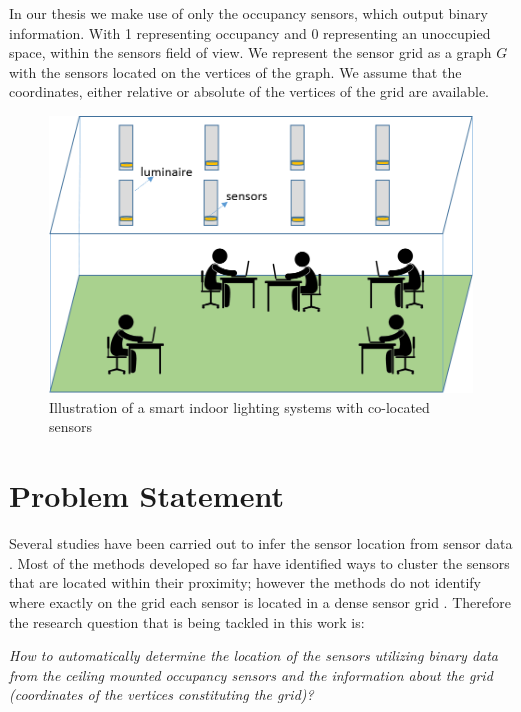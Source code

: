 In our thesis we make use of only the occupancy sensors, which output binary information. With 1 representing occupancy and 0 representing an unoccupied space, within the sensors field of view. We represent the sensor grid as a graph $G$ with the sensors located on the vertices of the graph. We assume that the coordinates, either relative or absolute of the vertices of the grid are available. 

\begin{figure}[!ht]
\includegraphics[scale=0.75]{./pics/systemDescription.png}
\caption{Illustration of a smart indoor lighting systems with co-located sensors}
\label{fig:sysDes}
\centering
\end{figure}

\section{Problem Statement}

Several studies  have been carried out to infer the sensor location from sensor data \cite{Hong:2013:TAS:2528282.2528302,doi:10.1061/9780784413616.226,Koc:2014:CLC:2674061.2674075,Lu:2014:SBS:2648771.2629441,ellis2012creating,muller2014automated,marinakis2005learning}. Most of the methods developed so far have identified ways to cluster the sensors that are located within their proximity; however the methods do not identify where exactly on the grid each sensor is located in a dense sensor grid \cite{Hong:2013:TAS:2528282.2528302,doi:10.1061/9780784413616.226,Koc:2014:CLC:2674061.2674075}.  Therefore the research question that is being tackled in this work is:

\textit{How to automatically determine the location of the sensors utilizing binary data from the ceiling mounted occupancy sensors and the information about the grid (coordinates of the vertices constituting the grid)?}\\



